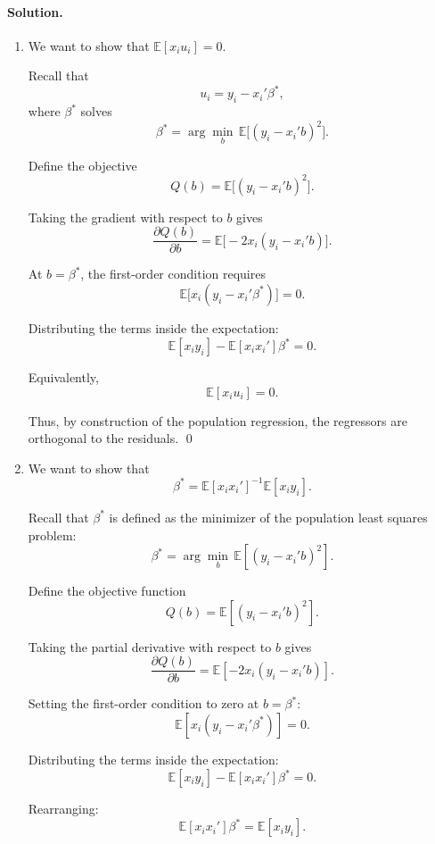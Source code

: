 \documentclass[12pt]{article}
\newcommand{\E}{\mathbb{E}}
\numberwithin{equation}{section}
\newcommand{\solution}{\paragraph{Solution.}}
\begin{document}
\solution
\begin{enumerate}[label=(\arabic*),leftmargin=1.3em]
  \item 
    We want to show that $\E[x_i u_i] = 0$.  
        
        Recall that 
        \[
        u_i = y_i - x_i'\beta^*,
        \]
        where $\beta^*$ solves
        \[
        \beta^* = \arg\min_b \, \E\!\big[(y_i - x_i'b)^2\big].
        \]
        
        Define the objective
        \[
        Q(b) = \E\!\big[(y_i - x_i'b)^2\big].
        \]
        
        Taking the gradient with respect to $b$ gives
        \[
        \frac{\partial Q(b)}{\partial b} 
        = \E\!\big[-2x_i(y_i - x_i'b)\big].
        \]
        
        At $b=\beta^*$, the first-order condition requires
        \[
        \E\!\big[x_i(y_i - x_i'\beta^*)\big] = 0.
        \]
        
        Distributing the terms inside the expectation:
        \[
        \E[x_i y_i] - \E[x_i x_i']\beta^* = 0.
        \]
        
        Equivalently,
        \[
        \E[x_i u_i] = 0.
        \]
        
        Thus, by construction of the population regression, the regressors are orthogonal to the residuals. \qed

  \item 
    We want to show that
    \[
    \beta^* = \E[x_i x_i']^{-1} \E[x_i y_i].
    \]

    Recall that $\beta^*$ is defined as the minimizer of the population least squares problem:
    \[
    \beta^* = \arg \min_b \, \E\!\left[(y_i - x_i'b)^2\right].
    \]

    Define the objective function
    \[
    Q(b) = \E\!\left[(y_i - x_i'b)^2\right].
    \]

    Taking the partial derivative with respect to $b$ gives
    \[
    \frac{\partial Q(b)}{\partial b} = \E\!\left[-2x_i(y_i - x_i'b)\right].
    \]

    Setting the first-order condition to zero at $b=\beta^*$:
    \[
    \E\!\left[x_i(y_i - x_i'\beta^*)\right] = 0.
    \]

    Distributing the terms inside the expectation:
    \[
    \E[x_i y_i] - \E[x_i x_i'] \beta^* = 0.
    \]

    Rearranging:
    \[
    \E[x_i x_i'] \beta^* = \E[x_i y_i].
    \]


\end{enumerate}
\end{document}
